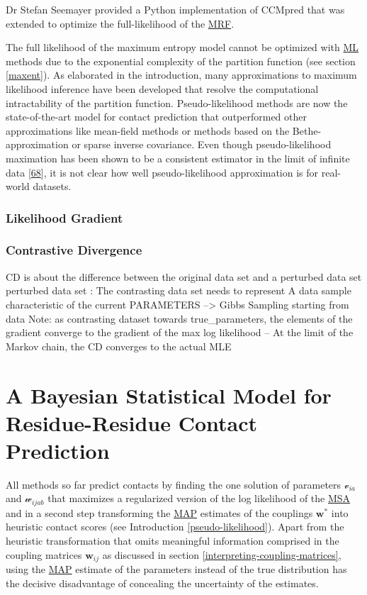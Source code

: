 \documentclass[12pt,a4paper,twoside]{book}
\newcommand{\via}{\mathcal{v}_{ia}}
\newcommand{\w}{\mathbf{w}}
\newcommand{\wij}{\mathbf{w}_{ij}}
\newcommand{\wijab}{\mathcal{w}_{ijab}}
\theoremstyle{definition}
\theoremstyle{definition}
\theoremstyle{remark}
\begin{document}
Dr Stefan Seemayer provided a Python implementation of CCMpred that was
extended to optimize the full-likelihood of the
\protect\hyperlink{abbrev}{MRF}.

The full likelihood of the maximum entropy model cannot be optimized
with \protect\hyperlink{abbrev}{ML} methods due to the exponential
complexity of the partition function (see section \ref{maxent}). As
elaborated in the introduction, many approximations to maximum
likelihood inference have been developed that resolve the computational
intractability of the partition function. Pseudo-likelihood methods are
now the state-of-the-art model for contact prediction that outperformed
other approximations like mean-field methods or methods based on the
Bethe-approximation or sparse inverse covariance. Even though
pseudo-likelihood maximation has been shown to be a consistent estimator
in the limit of infinite data
{[}\protect\hyperlink{ref-Besag1975}{68}{]}, it is not clear how well
pseudo-likelihood approximation is for real-world datasets.

\subsection{Likelihood Gradient}\label{likelihood-gradient}

\subsection{Contrastive Divergence}\label{contrastive-divergence}

CD is about the difference between the original data set and a perturbed
data set perturbed data set : The contrasting data set needs to
represent A data sample characteristic of the current PARAMETERS
--\textgreater{} Gibbs Sampling starting from data Note: as contrasting
dataset towards true\_parameters, the elements of the gradient converge
to the gradient of the max log likelihood -- At the limit of the Markov
chain, the CD converges to the actual MLE

\chapter{A Bayesian Statistical Model for Residue-Residue Contact
Prediction}\label{a-bayesian-statistical-model-for-residue-residue-contact-prediction}

All methods so far predict contacts by finding the one solution of
parameters \(\via\) and \(\wijab\) that maximizes a regularized version
of the log likelihood of the \protect\hyperlink{abbrev}{MSA} and in a
second step transforming the \protect\hyperlink{abbrev}{MAP} estimates
of the couplings \(\w^*\) into heuristic contact scores (see
Introduction \ref{pseudo-likelihood}). Apart from the heuristic
transformation that omits meaningful information comprised in the
coupling matrices \(\wij\) as discussed in section
\ref{interpreting-coupling-matrices}, using the
\protect\hyperlink{abbrev}{MAP} estimate of the parameters instead of
the true distribution has the decisive disadvantage of concealing the
uncertainty of the estimates.
\end{document}

